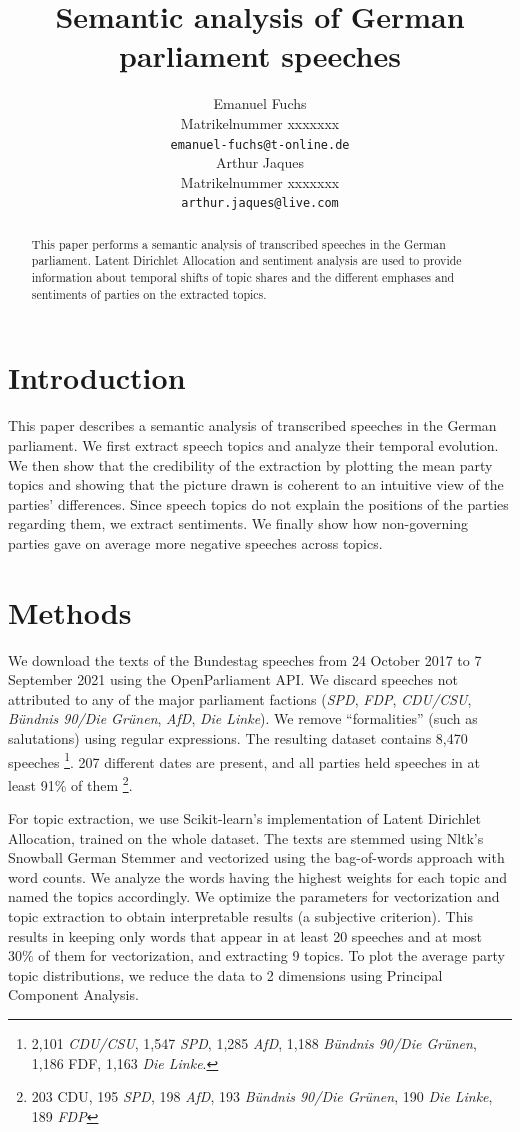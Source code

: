 \documentclass{article}
\title{Semantic analysis of German parliament speeches}
\author{%
  Emanuel Fuchs\\
  Matrikelnummer xxxxxxx\\
  \texttt{emanuel-fuchs@t-online.de} \\
  \And
  Arthur Jaques\\
  Matrikelnummer xxxxxxx\\
  \texttt{arthur.jaques@live.com} \\
}
\begin{document}
\maketitle


\begin{abstract}
  This paper performs a semantic analysis of transcribed speeches in the German parliament.
  Latent Dirichlet Allocation and sentiment analysis are used to provide information about temporal shifts of topic shares and the different emphases and sentiments of parties on the extracted topics. 
\end{abstract}


\section{Introduction}
This paper describes a semantic analysis of transcribed speeches in the German parliament. 
We first extract speech topics and analyze their temporal evolution.
We then show that the credibility of the extraction by plotting the mean party topics and showing that the picture drawn is coherent to an intuitive view of the parties' differences.
Since speech topics do not explain the positions of the parties regarding them, we extract sentiments.
We finally show how non-governing parties gave on average more negative speeches across topics.


\section{Methods}
We download the texts of the Bundestag speeches from 24 October 2017 to 7 September 2021 using the OpenParliament \cite{OpenParliamentTV} API.
We discard speeches not attributed to any of the major parliament factions (\textit{SPD}, \textit{FDP}, \textit{CDU/CSU}, \textit{Bündnis 90/Die Grünen}, \textit{AfD}, \textit{Die Linke}).
We remove ``formalities'' (such as salutations) using regular expressions.
The resulting dataset contains 8,470 speeches
\footnote{2,101 \textit{CDU/CSU}, 1,547 \textit{SPD}, 1,285 \textit{AfD}, 1,188 \textit{Bündnis 90/Die Grünen}, 1,186 FDF, 1,163 \textit{Die Linke}.}.
207 different dates are present, and all parties held speeches in at least 91\% of them
\footnote{203 CDU, 195 \textit{SPD}, 198 \textit{AfD}, 193 \textit{Bündnis 90/Die Grünen}, 190 \textit{Die Linke}, 189 \textit{FDP}}.

For topic extraction, we use Scikit-learn's \cite{Scikit-learn} implementation of Latent Dirichlet Allocation, trained on the whole dataset.
The texts are stemmed using Nltk's \cite{Nltk} Snowball German Stemmer and vectorized using the bag-of-words approach with word counts.
We analyze the words having the highest weights for each topic and named the topics accordingly.
We optimize the parameters for vectorization and topic extraction to obtain interpretable results (a subjective criterion).
This results in keeping only words that appear in at least 20 speeches and at most 30\% of them for vectorization, and extracting 9 topics.
To plot the average party topic distributions, we reduce the data to 2 dimensions using Principal Component Analysis.
\end{document}
